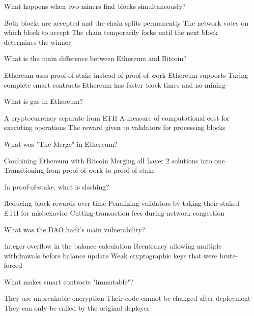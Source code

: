 \documentclass[10pt,a4paper,american]{exam}
\begin{document}
\begin{questions}
	\question What happens when two miners find blocks simultaneously?
	\begin{randomizechoices}
		\choice Both blocks are accepted and the chain splits permanently
		\choice The network votes on which block to accept
		\CorrectChoice The chain temporarily forks until the next block determines the winner
	\end{randomizechoices}

	\question What is the main difference between Ethereum and Bitcoin?
	\begin{randomizechoices}
		\choice Ethereum uses proof-of-stake instead of proof-of-work
		\CorrectChoice Ethereum supports Turing-complete smart contracts
		\choice Ethereum has faster block times and no mining
	\end{randomizechoices}

	\question What is gas in Ethereum?
	\begin{randomizechoices}
		\choice A cryptocurrency separate from ETH
		\CorrectChoice A measure of computational cost for executing operations
		\choice The reward given to validators for processing blocks
	\end{randomizechoices}

	\question What was "The Merge" in Ethereum?
	\begin{randomizechoices}
		\choice Combining Ethereum with Bitcoin
		\choice Merging all Layer 2 solutions into one
		\CorrectChoice Transitioning from proof-of-work to proof-of-stake
	\end{randomizechoices}

	\question In proof-of-stake, what is slashing?
	\begin{randomizechoices}
		\choice Reducing block rewards over time
		\CorrectChoice Penalizing validators by taking their staked ETH for misbehavior
		\choice Cutting transaction fees during network congestion
	\end{randomizechoices}

	\question What was the DAO hack's main vulnerability?
	\begin{randomizechoices}
		\choice Integer overflow in the balance calculation
		\CorrectChoice Reentrancy allowing multiple withdrawals before balance update
		\choice Weak cryptographic keys that were brute-forced
	\end{randomizechoices}

	\question What makes smart contracts "immutable"?
	\begin{randomizechoices}
		\choice They use unbreakable encryption
		\CorrectChoice Their code cannot be changed after deployment
		\choice They can only be called by the original deployer
	\end{randomizechoices}


\end{questions}
\end{document}
